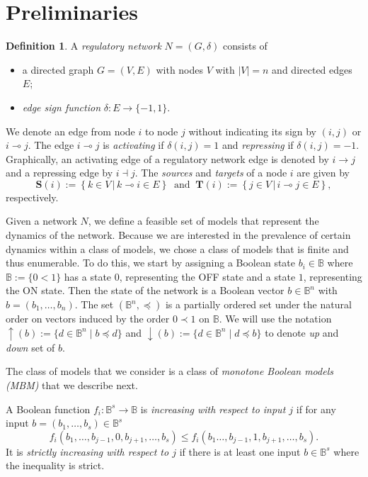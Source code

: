 \documentclass[12pt]{amsart}
\newcommand{\setdef}[2]{\left\{{#1}\,\left|\,{#2}\right.\right\}}
\newcommand{\bbB}{\mathbb{B}}
\newcommand{\Targets}{\mathbf{T}}
\newcommand{\Sources}{\mathbf{S}}
\theoremstyle{definition}
\newtheorem{defn}[thm]{Definition}
\begin{document}
\section{Preliminaries}\label{sec:prelim}


\begin{defn} \label{def:RN}
A \textit{regulatory network} $N = (G,\delta)$ consists of 
\begin{itemize}
    \item a directed graph $G=(V,E)$ with nodes $V$ with $|V|=n$ and directed edges $E$;
    \item \textit{ edge sign function} $\delta: E \to \{-1,1\}$.
\end{itemize}
We denote an edge from node $i$ to node $j$ without indicating its sign by $(i, j)$ or $i\multimap j$. The edge $i \multimap j$ is \textit{activating} if $\delta(i, j) = 1$ and \textit{repressing} if $\delta(i, j) = -1$. Graphically, an activating edge of a regulatory network edge is denoted by $i\to j$ and a repressing edge by $i \dashv j$. The \textit{sources} and \textit{targets} of a node $i$ are given by 
\[
    \Sources(i):= \setdef{k\in V}{k\multimap i \in E} \ \text{ and } \ \Targets(i):= \setdef{j\in V}{i\multimap j \in E},
\]
respectively.
\end{defn}


Given a network $N$, we define a feasible set of models that represent the dynamics of the network. Because we are interested in the prevalence of certain dynamics within a class of models, we chose a class of models that is finite and thus enumerable. To do this, we start by assigning a Boolean state $b_i\in \bbB$ where $\bbB:=\{0< 1\}$ has a state $0$, representing the OFF state and a state $1$, representing the ON state. Then the state of the network is a Boolean vector $b\in \bbB^n$ with $b=(b_1, \ldots, b_n)$. 
The set $(\bbB^n, \preceq)$ is a partially ordered set under the natural order on vectors induced by the order $0\prec 1$ on $\bbB$. We will use the notation $\uparrow(b) :=\{ d\in \bbB^n \;|\; b \preceq d\}$ and $\downarrow(b) :=\{ d\in \bbB^n \;|\; d \preceq b\}$ to denote \textit{up} and \textit{ down} set of $b$.

The class of models that we consider is a class of \textit{ monotone Boolean models (MBM)} that we describe next. 

A Boolean function $f_i \colon \bbB^s \to \bbB$ is \emph{increasing with respect to input $j$} if for any input $b=(b_1, \ldots, b_s) \in \bbB^s$
\[
f_i(b_1, \ldots, b_{j-1}, 0, b_{j+1}, \ldots, b_s) \leq f_i(b_1 \ldots, b_{j-1}, 1, b_{j+1}, \ldots, b_s).
\]
It is \emph{strictly increasing with respect to $j$} if there is at least one input $b \in \bbB^s$ where the inequality is strict.
\end{document}
